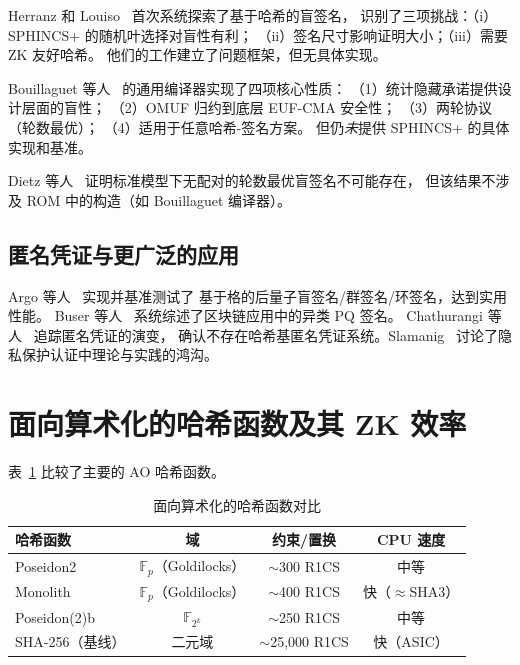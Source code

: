 \documentclass[11pt,a4paper]{ctexart}
\begin{document}
Herranz 和 Louiso~\cite{Herranz2025HashBased} 首次系统探索了基于哈希的盲签名，
识别了三项挑战：（i）SPHINCS+ 的随机叶选择对盲性有利；
（ii）签名尺寸影响证明大小；（iii）需要 ZK 友好哈希。
他们的工作建立了问题框架，但无具体实现。

Bouillaguet 等人~\cite{Bouillaguet2026BlindingPH} 的通用编译器实现了四项核心性质：
（1）统计隐藏承诺提供设计层面的盲性；
（2）OMUF 归约到底层 EUF-CMA 安全性；
（3）两轮协议（轮数最优）；
（4）适用于任意哈希-签名方案。
但仍\emph{未}提供 SPHINCS+ 的具体实现和基准。

Dietz 等人~\cite{Dietz2026Impossibility} 证明标准模型下无配对的轮数最优盲签名不可能存在，
但该结果不涉及 ROM 中的构造（如 Bouillaguet 编译器）。

\subsection{匿名凭证与更广泛的应用}

Argo 等人~\cite{Argo2024PracticalPQ} 实现并基准测试了
基于格的后量子盲签名/群签名/环签名，达到实用性能。
Buser 等人~\cite{Buser2022ExoticSigs} 系统综述了区块链应用中的异类 PQ 签名。
Chathurangi 等人~\cite{Chathurangi2025Advances} 追踪匿名凭证的演变，
确认不存在哈希基匿名凭证系统。Slamanig~\cite{Slamanig2025PrivacyAuth}
讨论了隐私保护认证中理论与实践的鸿沟。

\section{面向算术化的哈希函数及其 ZK 效率}

表~\ref{tab:hash} 比较了主要的 AO 哈希函数。

\begin{table}[h]
\centering
\caption{面向算术化的哈希函数对比}
\label{tab:hash}
\small
\begin{tabular}{@{}lccc@{}}
\toprule
\textbf{哈希函数} & \textbf{域} & \textbf{约束/置换} & \textbf{CPU 速度} \\
\midrule
Poseidon2~\cite{Grassi2023Poseidon2} & $\mathbb{F}_p$（Goldilocks） & $\sim$300 R1CS & 中等 \\
Monolith~\cite{Grassi2024Monolith} & $\mathbb{F}_p$（Goldilocks） & $\sim$400 R1CS & 快（$\approx$SHA3） \\
Poseidon(2)b~\cite{Grassi2026Poseidon2b} & $\mathbb{F}_{2^k}$ & $\sim$250 R1CS & 中等 \\
SHA-256（基线） & 二元域 & $\sim$25,000 R1CS & 快（ASIC） \\
\bottomrule
\end{tabular}
\end{table}
\end{document}
